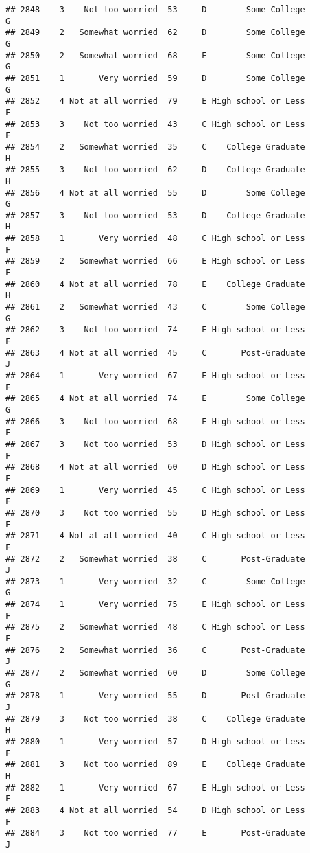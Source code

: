 \documentclass[
]{article}
\begin{document}
\begin{verbatim}
## 2848    3    Not too worried  53     D        Some College         G
## 2849    2   Somewhat worried  62     D        Some College         G
## 2850    2   Somewhat worried  68     E        Some College         G
## 2851    1       Very worried  59     D        Some College         G
## 2852    4 Not at all worried  79     E High school or Less         F
## 2853    3    Not too worried  43     C High school or Less         F
## 2854    2   Somewhat worried  35     C    College Graduate         H
## 2855    3    Not too worried  62     D    College Graduate         H
## 2856    4 Not at all worried  55     D        Some College         G
## 2857    3    Not too worried  53     D    College Graduate         H
## 2858    1       Very worried  48     C High school or Less         F
## 2859    2   Somewhat worried  66     E High school or Less         F
## 2860    4 Not at all worried  78     E    College Graduate         H
## 2861    2   Somewhat worried  43     C        Some College         G
## 2862    3    Not too worried  74     E High school or Less         F
## 2863    4 Not at all worried  45     C       Post-Graduate         J
## 2864    1       Very worried  67     E High school or Less         F
## 2865    4 Not at all worried  74     E        Some College         G
## 2866    3    Not too worried  68     E High school or Less         F
## 2867    3    Not too worried  53     D High school or Less         F
## 2868    4 Not at all worried  60     D High school or Less         F
## 2869    1       Very worried  45     C High school or Less         F
## 2870    3    Not too worried  55     D High school or Less         F
## 2871    4 Not at all worried  40     C High school or Less         F
## 2872    2   Somewhat worried  38     C       Post-Graduate         J
## 2873    1       Very worried  32     C        Some College         G
## 2874    1       Very worried  75     E High school or Less         F
## 2875    2   Somewhat worried  48     C High school or Less         F
## 2876    2   Somewhat worried  36     C       Post-Graduate         J
## 2877    2   Somewhat worried  60     D        Some College         G
## 2878    1       Very worried  55     D       Post-Graduate         J
## 2879    3    Not too worried  38     C    College Graduate         H
## 2880    1       Very worried  57     D High school or Less         F
## 2881    3    Not too worried  89     E    College Graduate         H
## 2882    1       Very worried  67     E High school or Less         F
## 2883    4 Not at all worried  54     D High school or Less         F
## 2884    3    Not too worried  77     E       Post-Graduate         J

\end{verbatim}
\end{document}
